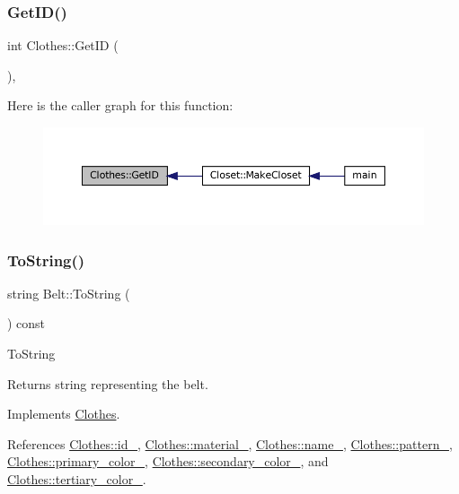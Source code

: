 \subsubsection{\texorpdfstring{Get\+I\+D()}{GetID()}}
{\footnotesize\ttfamily int Clothes\+::\+Get\+ID (\begin{DoxyParamCaption}{ }\end{DoxyParamCaption})\hspace{0.3cm}{\ttfamily [inline]}, {\ttfamily [inherited]}}

Here is the caller graph for this function\+:\nopagebreak
\begin{figure}[H]
\begin{center}
\leavevmode
\includegraphics[width=350pt]{classClothes_a3f6dac172f333126d19010f85ec44e4c_icgraph}
\end{center}
\end{figure}
\mbox{\label{classBelt_af09e2b5e51b7603ec5dede2e6b0a753f}} 
\subsubsection{\texorpdfstring{To\+String()}{ToString()}}
{\footnotesize\ttfamily string Belt\+::\+To\+String (\begin{DoxyParamCaption}{ }\end{DoxyParamCaption}) const\hspace{0.3cm}{\ttfamily [virtual]}}

To\+String \begin{DoxyReturn}{Returns}
\textquotesingle{}string\textquotesingle{} representing the belt. 
\end{DoxyReturn}


Implements \mbox{\hyperlink{classClothes_a953d143394e9a2c007ab0c3a638973cf}{Clothes}}.



References \mbox{\hyperlink{classClothes_a8978d931db5ca47c3ccea30def4ae83e}{Clothes\+::id\+\_\+}}, \mbox{\hyperlink{classClothes_adbb9ed311f14ccbb1e4fe0e8378a95d4}{Clothes\+::material\+\_\+}}, \mbox{\hyperlink{classClothes_a7f2275aaae24224d60c48af922c31b65}{Clothes\+::name\+\_\+}}, \mbox{\hyperlink{classClothes_a1d40145a4eb6d28441f112f030ab5d35}{Clothes\+::pattern\+\_\+}}, \mbox{\hyperlink{classClothes_a7cb005bf6cbb7f4eaa40f1b31817559c}{Clothes\+::primary\+\_\+color\+\_\+}}, \mbox{\hyperlink{classClothes_ab8f55f67b956b25d71260cffcf273673}{Clothes\+::secondary\+\_\+color\+\_\+}}, and \mbox{\hyperlink{classClothes_a3c5f1e7ab531e3ba7a38b930da8078a0}{Clothes\+::tertiary\+\_\+color\+\_\+}}.

